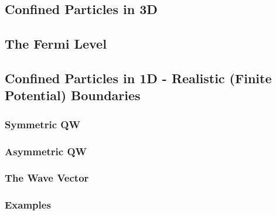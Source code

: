 \documentclass[../../Quantum-Technologies-Notes]{subfiles}
\begin{document}
		\subsection{Confined Particles in 3D}
			
			
			
			\vspace{2cm}
			
			
			
		
		\subsection{The Fermi Level}
		
		
		\subsection{Confined Particles in 1D - Realistic (Finite Potential) Boundaries}
		
			
			
			
			
			
			
			\subsubsection{Symmetric QW}
				
			
			\subsubsection{Asymmetric QW}
				
			
			\subsubsection{The Wave Vector}
			
			
			\subsubsection{Examples}
			
				
				
				
			
\end{document}

